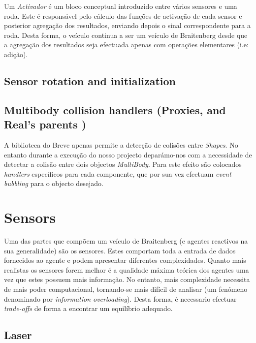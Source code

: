 \documentclass[a4paper]{article}
\begin{document}
Um \emph{Activador} é um bloco conceptual introduzido entre vários sensores e uma roda.
Este é responsável pelo cálculo das funções de activação de cada sensor e posterior agregação dos resultados, enviando depois o sinal correspondente para a roda. Desta forma, o veículo continua a ser um veículo de Braitenberg desde que a agregação dos resultados seja efectuada apenas com operações elementares (i.e: adição). 


\subsection{Sensor rotation and initialization}
\indent \indent 

\subsection{Multibody collision handlers (Proxies, and Real's parents )}
\indent \indent A biblioteca do Breve apenas permite a detecção de colisões entre \emph{Shapes}. 
No entanto durante a execução do nosso projecto deparámo-nos com a necessidade de detectar a colisão entre dois objectos \emph{MultiBody}.
Para este efeito são colocados \emph{handlers} específicos para cada componente, que por sua vez efectuam \emph{event bubbling} para o objecto desejado.

\cleardoublepage
\section{Sensors}
\indent \indent Uma das partes que compõem um veículo de Braitenberg (e agentes reactivos na sua generalidade) são os sensores.
Estes comportam toda a entrada de dados fornecidos ao agente e podem apresentar diferentes complexidades.
Quanto mais realistas os sensores forem melhor é a qualidade máxima teórica dos agentes uma vez que estes possuem mais informação.
No entanto, mais complexidade necessita de mais poder computacional, tornando-se mais difícil de analisar (um fenómeno denominado por \emph{information overloading}).
Desta forma, é necessario efectuar \emph{trade-offs} de forma a encontrar um equilíbrio adequado.

\cleardoublepage
\subsection{Laser}
\end{document}

